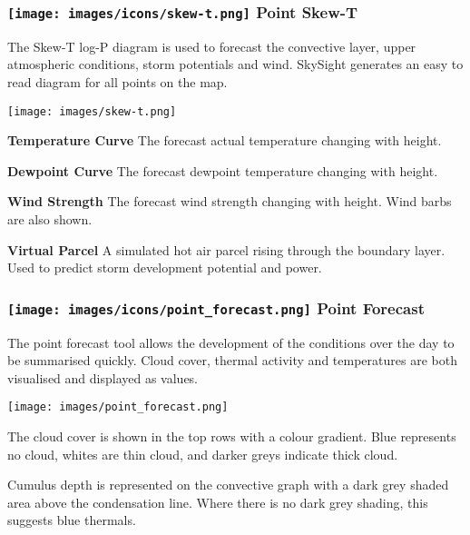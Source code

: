\documentclass[9pt,a4paper,twocolumn]{article}
\begin{document}
\subsubsection*{\texttt{[image: images/icons/skew-t.png]} Point Skew-T}
The Skew-T log-P diagram is used to forecast the convective layer, upper atmospheric conditions, storm potentials and wind. SkySight generates an easy to read diagram for all points on the map.

\texttt{[image: images/skew-t.png]}

\begin{arrow_red}
\item \textbf{Temperature Curve} The forecast actual temperature changing with height.
\end{arrow_red}
\begin{arrow_green}
\item \textbf{Dewpoint Curve} The forecast dewpoint temperature changing with height.
\end{arrow_green}
\begin{arrow_blue}
\item \textbf{Wind Strength} The forecast wind strength changing with height. Wind barbs are also shown.
\end{arrow_blue}
\begin{arrow_pink}
\item \textbf{Virtual Parcel} A simulated hot air parcel rising through the boundary layer. Used to predict storm development potential and power.
\end{arrow_pink}

\subsubsection*{\texttt{[image: images/icons/point\_forecast.png]} Point Forecast}

The point forecast tool allows the development of the conditions over the day to be summarised quickly. Cloud cover, thermal activity and temperatures are both visualised and displayed as values.

\texttt{[image: images/point\_forecast.png]}

The cloud cover is shown in the top rows with a colour gradient. Blue represents no cloud, whites are thin cloud, and darker greys indicate thick cloud.

Cumulus depth is represented on the convective graph with a dark grey shaded area above the condensation line. Where there is no dark grey shading, this suggests blue thermals.
\end{document}
